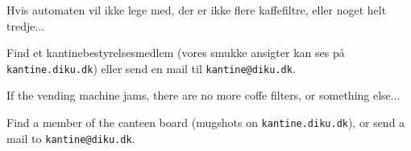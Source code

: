 \documentclass{article}
\begin{document}
\maketitle

\vspace{-0.5cm}


\vspace{-1.2cm}

\begin{center}

\LARGE

Hvis automaten vil ikke lege med, der er ikke flere kaffefiltre, eller noget
helt tredje$\ldots$\\

\Huge

Find et kantinebestyrelsesmedlem (vores smukke ansigter kan ses på
\texttt{kantine.diku.dk}) eller send en mail til
\texttt{kantine@diku.dk}.

\end{center}

\english

\vspace{-0.3cm}


\vspace{-1.2cm}

\begin{center}

\LARGE

If the vending machine jams, there are no more coffe filters, or something
else$\ldots$\\

\Huge

Find a member of the canteen board (mugshots on \texttt{kantine.diku.dk}), or
send a mail to \texttt{kantine@diku.dk}.

\end{center}

\dansk

\underskriv
\end{document}
